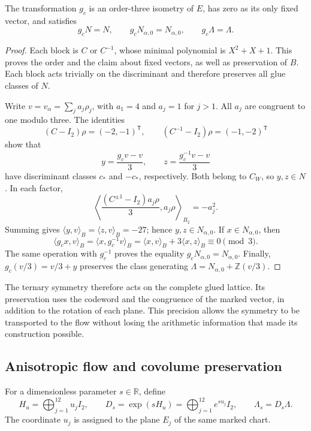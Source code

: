 \begin{proposition}
\label{prop:leech-c3}
The transformation \(g_c\) is an order-three isometry of \(E\),
has zero as its only fixed vector, and satisfies
\[
 g_cN=N,\qquad g_cN_{\alpha,0}=N_{\alpha,0},
 \qquad g_c\Lambda=\Lambda.
\]
\end{proposition}
\begin{proof}
Each block is \(C\) or \(C^{-1}\), whose minimal polynomial is
\(X^2+X+1\). This proves the order and the claim about fixed vectors,
as well as preservation of \(B\). Each block acts trivially on
the discriminant and therefore preserves all glue classes of
\(N\).

Write \(v=v_\alpha=\sum_j a_j\rho_j\), with \(a_1=4\) and
\(a_j=1\) for \(j>1\). All \(a_j\) are congruent to one
modulo three. The identities
\[
 (C-I_2)\rho=(-2,-1)^{\mathsf T},
 \qquad (C^{-1}-I_2)\rho=(-1,-2)^{\mathsf T}
\]
show that
\[
 y=\frac{g_cv-v}{3},\qquad z=\frac{g_c^{-1}v-v}{3}
\]
have discriminant classes \(c_*\) and \(-c_*\), respectively.
Both belong to \(C_W\), so \(y,z\in N\). In each factor,
\[
 \left\langle
 \frac{(C^{\pm1}-I_2)a_j\rho}{3},a_j\rho
 \right\rangle_{B_2}=-a_j^2.
\]
Summing gives \(\langle y,v\rangle_B=\langle z,v\rangle_B=-27\);
hence \(y,z\in N_{\alpha,0}\).
If \(x\in N_{\alpha,0}\), then
\[
 \langle g_cx,v\rangle_B
  =\langle x,g_c^{-1}v\rangle_B
  =\langle x,v\rangle_B+3\langle x,z\rangle_B
  \equiv0\pmod3.
\]
The same operation with \(g_c^{-1}\) proves the equality
\(g_cN_{\alpha,0}=N_{\alpha,0}\). Finally,
\(g_c(v/3)=v/3+y\) preserves the class generating
\(\Lambda=N_{\alpha,0}+\mathbb Z(v/3)\).
\end{proof}

The ternary symmetry therefore acts on the complete glued
lattice. Its preservation uses the codeword and
the congruence of the marked vector, in addition to the rotation of each
plane. This precision allows the symmetry to be transported to the flow without
losing the arithmetic information that made its construction possible.

\subsection{Anisotropic flow and covolume preservation}
\label{subsec:leech-flow}

\begin{definition}
For a dimensionless parameter \(s\in\mathbb R\), define
\begin{equation}
 H_u=\bigoplus_{j=1}^{12}u_jI_2,\qquad
 D_s=\exp(sH_u)=\bigoplus_{j=1}^{12}e^{su_j}I_2,\qquad
 \Lambda_s=D_s\Lambda.
 \label{eq:leech-flow}
\end{equation}
The coordinate \(u_j\) is assigned to the plane \(E_j\) of the same marked
chart.
\end{definition}

